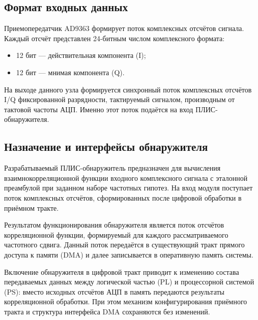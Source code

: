 \subsection{Формат входных данных}

Приемопередатчик AD9363 формирует поток комплексных отсчётов сигнала. Каждый отсчёт представлен 24-битным числом комплексного формата:
\begin{itemize}
	\item 12 бит --- действительная компонента (I);
	\item 12 бит --- мнимая компонента (Q).
\end{itemize}


На выходе данного узла формируется синхронный поток комплексных отсчётов I/Q фиксированной разрядности, тактируемый сигналом, производным от тактовой частоты АЦП. Именно этот поток подаётся на вход ПЛИС-обнаружителя.

\subsection{Назначение и интерфейсы обнаружителя}

Разрабатываемый ПЛИС-обнаружитель предназначен для вычисления взаимнокорреляционной функции входного комплексного сигнала с эталонной преамбулой при заданном наборе частотных гипотез. На вход модуля поступает поток комплексных отсчётов, сформированных после цифровой обработки в приёмном тракте.

Результатом функционирования обнаружителя является поток отсчётов корреляционной функции, формируемый для каждого рассматриваемого частотного сдвига. Данный поток передаётся в существующий тракт прямого доступа к памяти (DMA) и далее записывается в оперативную память системы.

Включение обнаружителя в цифровой тракт приводит к изменению состава передаваемых данных между логической частью (PL) и процессорной системой (PS): вместо исходных отсчётов АЦП в память передаются результаты корреляционной обработки. При этом механизм конфигурирования приёмного тракта и структура интерфейса DMA сохраняются без изменений.








